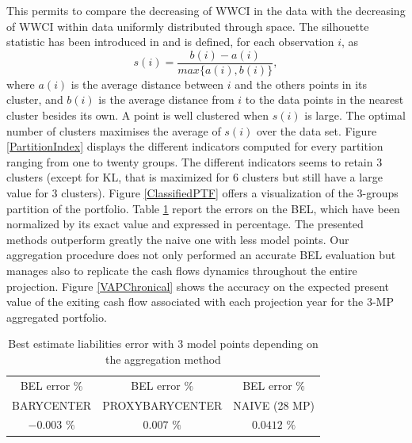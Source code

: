 This permits to compare the decreasing of WWCI in the data with the decreasing of WWCI within data uniformly distributed through space. The silhouette statistic has been introduced in \citet{KaRo90} and is defined, for each observation $i$, as 
\begin{equation}\label{Silhouette}
s(i)=\frac{b(i)-a(i)}{max\{a(i),b(i)\}},
\end{equation} 
where $a(i)$ is the average distance between $i$ and the others points in its cluster, and $b(i)$ is the average distance from $i$ to the data points in the nearest cluster besides its own.  A point is well clustered when $s(i)$ is large. The optimal number of clusters maximises the average of $s(i)$ over the data set. Figure \ref{PartitionIndex} displays the different indicators computed for every partition ranging from one to twenty groups. The different indicators seems to retain $3$ clusters (except for KL, that is maximized for $6$ clusters but still have a large value for $3$ clusters). Figure \ref{ClassifiedPTF} offers a visualization of the $3$-groups partition of the portfolio. Table \ref{3GroupsBELError} report the errors on the BEL, which have been normalized by its exact value and expressed in percentage. The presented methods outperform greatly the naive one with less model points. Our aggregation procedure does not only performed an accurate BEL evaluation but manages also to replicate the cash flows dynamics throughout the entire projection. Figure \ref{VAPChronical} shows the accuracy on the expected present value of the exiting cash flow associated with each projection year for the $3$-MP aggregated portfolio.
\begin{table}[ht!]
\centering
\begin{tabular}{|c|c|c|}
\hline
BEL error $\%$ &BEL error $\%$& BEL error $\%$\\
 BARYCENTER& PROXYBARYCENTER& NAIVE (28 MP)\\
\hline\hline
$-0.003$ $\%$&$0.007$ $\%$& $0.0412$ $\%$\\
\hline
\end{tabular}
\caption{Best estimate liabilities error with 3 model points depending on the aggregation method}
\label{3GroupsBELError}
\end{table}
